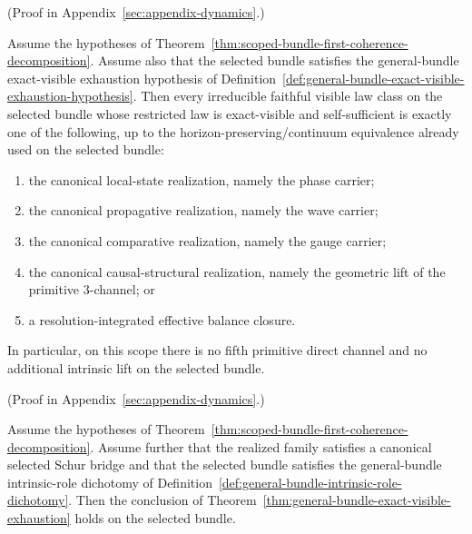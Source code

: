 (Proof in Appendix~\ref{sec:appendix-dynamics}.)

\begin{theorem}
\label{thm:general-bundle-exact-visible-exhaustion}
Assume the hypotheses of
Theorem~\ref{thm:scoped-bundle-first-coherence-decomposition}. Assume also that
the selected bundle satisfies the general-bundle exact-visible exhaustion
hypothesis of
Definition~\ref{def:general-bundle-exact-visible-exhaustion-hypothesis}. Then
every irreducible faithful visible law class on the selected bundle whose
restricted law is exact-visible and self-sufficient is exactly one of the
following, up to the horizon-preserving/continuum equivalence already used on
the selected bundle:
\begin{enumerate}[label=(\roman*), leftmargin=2em, itemsep=0.2em]
\item the canonical local-state realization, namely the phase carrier;
\item the canonical propagative realization, namely the wave carrier;
\item the canonical comparative realization, namely the gauge carrier;
\item the canonical causal-structural realization, namely the geometric lift
      of the primitive \(3\)-channel; or
\item a resolution-integrated effective balance closure.
\end{enumerate}
In particular, on this scope there is no fifth primitive direct channel and no
additional intrinsic lift on the selected bundle.
\end{theorem}

(Proof in Appendix~\ref{sec:appendix-dynamics}.)

\begin{corollary}
\label{cor:intrinsic-role-dichotomy-closes-general-bundle-exhaustion}
Assume the hypotheses of
Theorem~\ref{thm:scoped-bundle-first-coherence-decomposition}. Assume further
that the realized family satisfies a canonical selected Schur bridge and that
the selected bundle satisfies the general-bundle intrinsic-role dichotomy of
Definition~\ref{def:general-bundle-intrinsic-role-dichotomy}. Then the
conclusion of
Theorem~\ref{thm:general-bundle-exact-visible-exhaustion} holds on the selected
bundle.
\end{corollary}

